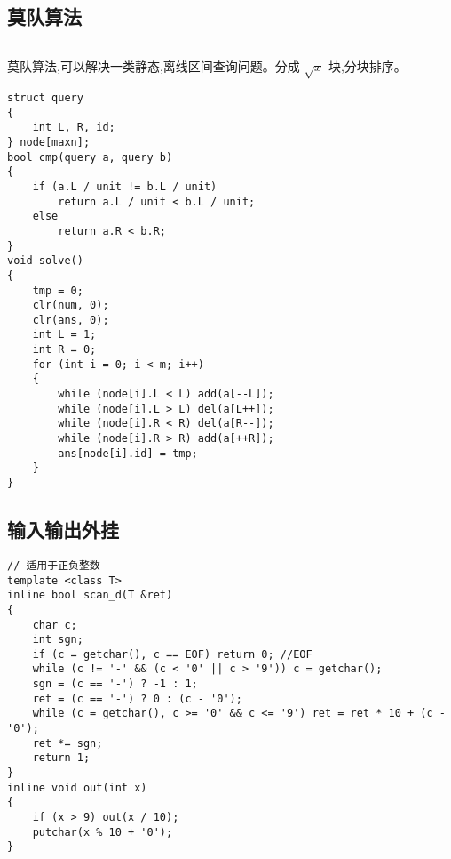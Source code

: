 \documentclass[a4]{article}
\begin{document}
\subsection{莫队算法}
\begin{lstlisting}
\end{lstlisting}
莫队算法,可以解决一类静态,离线区间查询问题。分成 $\sqrt{x}$ 块,分块排序。
\begin{lstlisting}
struct query
{
    int L, R, id;
} node[maxn];
bool cmp(query a, query b)
{
    if (a.L / unit != b.L / unit)
        return a.L / unit < b.L / unit;
    else
        return a.R < b.R;
}
void solve()
{
    tmp = 0;
    clr(num, 0);
    clr(ans, 0);
    int L = 1;
    int R = 0;
    for (int i = 0; i < m; i++)
    {
        while (node[i].L < L) add(a[--L]);
        while (node[i].L > L) del(a[L++]);
        while (node[i].R < R) del(a[R--]);
        while (node[i].R > R) add(a[++R]);
        ans[node[i].id] = tmp;
    }
}
\end{lstlisting}
\subsection{输入输出外挂}
\begin{lstlisting}
// 适用于正负整数
template <class T>
inline bool scan_d(T &ret)
{
    char c;
    int sgn;
    if (c = getchar(), c == EOF) return 0; //EOF
    while (c != '-' && (c < '0' || c > '9')) c = getchar();
    sgn = (c == '-') ? -1 : 1;
    ret = (c == '-') ? 0 : (c - '0');
    while (c = getchar(), c >= '0' && c <= '9') ret = ret * 10 + (c - '0');
    ret *= sgn;
    return 1;
}
inline void out(int x)
{
    if (x > 9) out(x / 10);
    putchar(x % 10 + '0');
}
\end{lstlisting}
\end{document}
